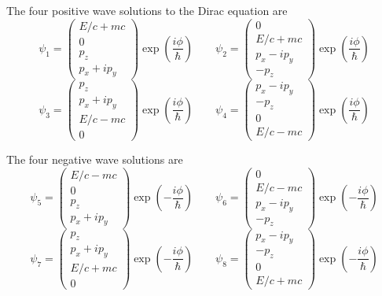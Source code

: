 \documentclass[12pt]{article}
\begin{document}
\noindent
The four positive wave solutions to the Dirac equation are
{\small
\begin{equation*}
\psi_1=\begin{pmatrix}E/c+mc\\0\\p_z\\p_x+ip_y\end{pmatrix}
\exp\left(\frac{i\phi}{\hbar}\right)
\qquad
\psi_2=\begin{pmatrix}0\\E/c+mc\\p_x-ip_y\\-p_z\end{pmatrix}
\exp\left(\frac{i\phi}{\hbar}\right)
\end{equation*}
\begin{equation*}
\psi_3=\begin{pmatrix}p_z\\p_x+ip_y\\E/c-mc\\0\end{pmatrix}
\exp\left(\frac{i\phi}{\hbar}\right)
\qquad
\psi_4=\begin{pmatrix}p_x-ip_y\\-p_z\\0\\E/c-mc\end{pmatrix}
\exp\left(\frac{i\phi}{\hbar}\right)
\end{equation*}
}

\noindent
The four negative wave solutions are
{\small
\begin{equation*}
\psi_5=\begin{pmatrix}E/c-mc\\0\\p_z\\p_x+ip_y\end{pmatrix}
\exp\left(-\frac{i\phi}{\hbar}\right)
\qquad
\psi_6=\begin{pmatrix}0\\E/c-mc\\p_x-ip_y\\-p_z\end{pmatrix}
\exp\left(-\frac{i\phi}{\hbar}\right)
\end{equation*}
\begin{equation*}
\psi_7=\begin{pmatrix}p_z\\p_x+ip_y\\E/c+mc\\0\end{pmatrix}
\exp\left(-\frac{i\phi}{\hbar}\right)
\qquad
\psi_8=\begin{pmatrix}p_x-ip_y\\-p_z\\0\\E/c+mc\end{pmatrix}
\exp\left(-\frac{i\phi}{\hbar}\right)
\end{equation*}
}
\end{document}
